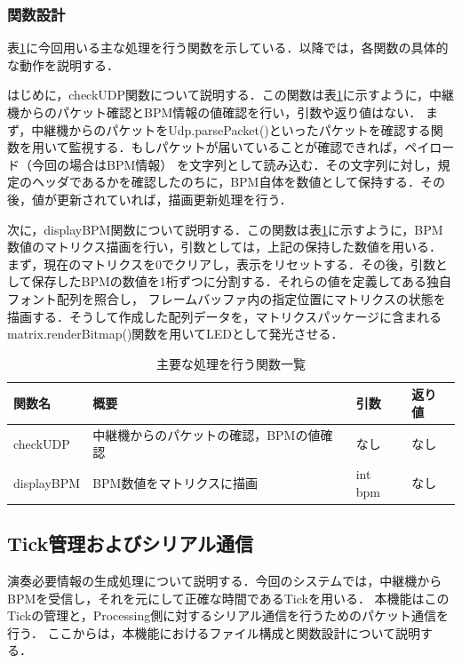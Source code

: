 \documentclass[lualatex,book,paper=a4paper,jafontsize=11.5pt,jafontscale=1.05]{jlreq}
\begin{document}
\subsubsection{関数設計}
表\ref{tab:func1}に今回用いる主な処理を行う関数を示している．以降では，各関数の具体的な動作を説明する．\par
はじめに，checkUDP関数について説明する．この関数は表\ref{tab:func1}に示すように，中継機からのパケット確認とBPM情報の値確認を行い，引数や返り値はない．
まず，中継機からのパケットをUdp.parsePacket()といったパケットを確認する関数を用いて監視する．もしパケットが届いていることが確認できれば，ペイロード（今回の場合はBPM情報）
を文字列として読み込む．その文字列に対し，規定のヘッダであるかを確認したのちに，BPM自体を数値として保持する．その後，値が更新されていれば，描画更新処理を行う．\par
次に，displayBPM関数について説明する．この関数は表\ref{tab:func1}に示すように，BPM数値のマトリクス描画を行い，引数としては，上記の保持した数値を用いる．
まず，現在のマトリクスを0でクリアし，表示をリセットする．その後，引数として保存したBPMの数値を1桁ずつに分割する．それらの値を定義してある独自フォント配列を照合し，
フレームバッファ内の指定位置にマトリクスの状態を描画する．そうして作成した配列データを，マトリクスパッケージに含まれるmatrix.renderBitmap()関数を用いてLEDとして発光させる．

\begin{table}[h]
    \vspace{-1em}
    \caption{主要な処理を行う関数一覧}
    \centering
    \label{tab:func1}
    \begin{tabular}{llll}
    \hline
    \textbf{関数名} & \textbf{概要} & \textbf{引数} & \textbf{返り値}\\
    \hline
    checkUDP & 中継機からのパケットの確認，BPMの値確認 & なし & なし\\
    \hline
    displayBPM & BPM数値をマトリクスに描画 & int bpm & なし\\
    \hline
    \end{tabular}
\end{table}


\subsection{Tick管理およびシリアル通信}
演奏必要情報の生成処理について説明する．今回のシステムでは，中継機からBPMを受信し，それを元にして正確な時間であるTickを用いる．
本機能はこのTickの管理と，Processing側に対するシリアル通信を行うためのパケット通信を行う．
ここからは，本機能におけるファイル構成と関数設計について説明する．
\end{document}
